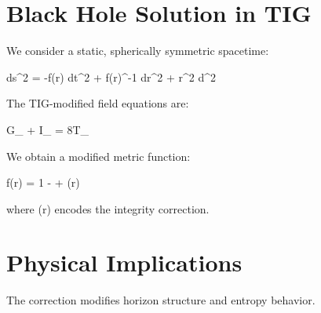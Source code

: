 \section{Black Hole Solution in TIG}

We consider a static, spherically symmetric spacetime:

ds^2 = -f(r) dt^2 + f(r)^{-1} dr^2 + r^2 d\Omega^2

The TIG-modified field equations are:

G_{\mu\nu} + \alpha I_{\mu\nu} = 8\pi T_{\mu\nu}

We obtain a modified metric function:

f(r) = 1 -  + \epsilon(r)

where \epsilon(r) encodes the integrity correction.

\section{Physical Implications}

The correction modifies horizon structure and entropy behavior.
